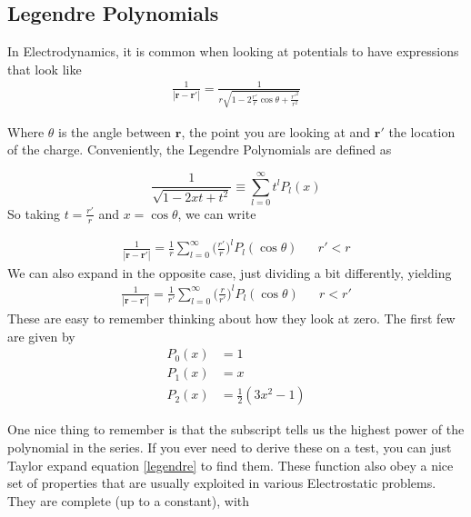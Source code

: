 \subsection{Legendre Polynomials}\label{legendrepoly}
In Electrodynamics, it is common when looking at potentials to have expressions that look like
\begin{align}
\frac{1}{|\textbf{r} - \textbf{r}'|} = \frac{1}{r\sqrt{1-2\frac{r'}{r}\cos\theta + \frac{r'^2}{r^2}}}
\end{align}

Where $\theta$ is the angle between $\textbf{r}$, the point you are looking at and $\textbf{r}'$ the location of the charge. Conveniently, the Legendre Polynomials are defined as 

\begin{equation}\label{legendre}
\frac{1}{\sqrt{1-2xt+t^2}} \equiv \sum_{l=0}^\infty t^l P_l(x)
\end{equation}
So taking $t = \frac{r'}{r}$ and $x = \cos\theta$, we can write

\begin{align}
\frac{1}{|\textbf{r} - \textbf{r}'|} = \frac{1}{r} \sum_{l=0}^\infty \Big(\frac{r'}{r}\Big)^l P_l(\cos\theta) && r' < r
\end{align}
We can also expand in the opposite case, just dividing a bit differently, yielding
\begin{align}
\frac{1}{|\textbf{r} - \textbf{r}'|} = \frac{1}{r'} \sum_{l=0}^\infty \Big(\frac{r}{r'}\Big)^l P_l(\cos\theta) && r < r'
\end{align}
These are easy to remember thinking about how they look at zero. The first few are given by
\begin{align}
P_0(x) &= 1\\
P_1(x) &= x\\
P_2(x) &= \frac{1}{2}(3x^2 -1)
\end{align}

One nice thing to remember is that the subscript tells us the highest power of the polynomial in the series. If you ever need to derive these on a test, you can just Taylor expand equation \ref{legendre} to find them. These function also obey a nice set of properties that are usually exploited in various Electrostatic problems. They are complete (up to a constant), with

